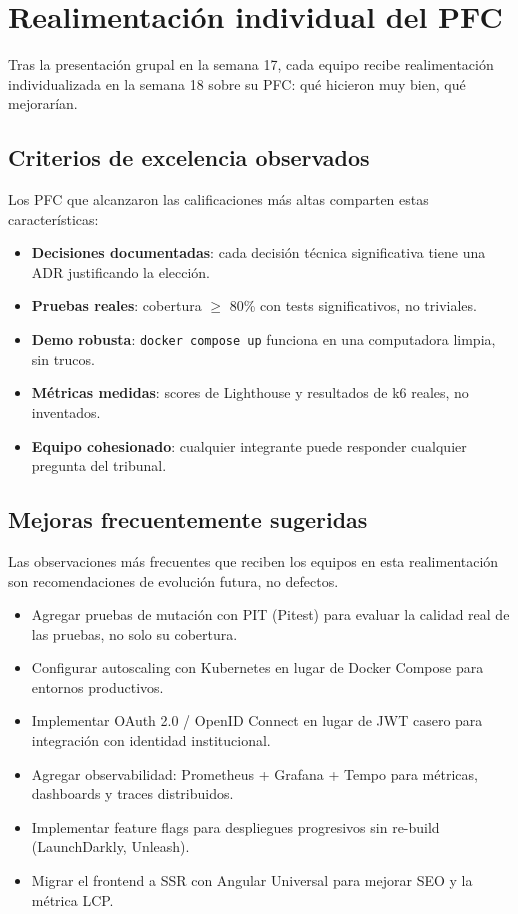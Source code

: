 \documentclass[11pt,a4paper,openany]{book}
\begin{document}
\section{Realimentación individual del PFC}

Tras la presentación grupal en la semana 17, cada equipo
recibe realimentación individualizada en la semana 18 sobre su
PFC: qué hicieron muy bien, qué mejorarían.


\subsection{Criterios de excelencia observados}

Los PFC que alcanzaron las calificaciones más altas comparten estas
características:

\begin{itemize}
\item \textbf{Decisiones documentadas}: cada decisión técnica
significativa tiene una ADR justificando la elección.
\item \textbf{Pruebas reales}: cobertura $\geq$ 80\% con tests
significativos, no triviales.
\item \textbf{Demo robusta}: \texttt{docker compose up} funciona en
una computadora limpia, sin trucos.
\item \textbf{Métricas medidas}: scores de Lighthouse y resultados de
k6 reales, no inventados.
\item \textbf{Equipo cohesionado}: cualquier integrante puede
responder cualquier pregunta del tribunal.
\end{itemize}

\subsection{Mejoras frecuentemente sugeridas}

Las observaciones más frecuentes que reciben los equipos
en esta realimentación son recomendaciones de evolución futura,
no defectos.


\begin{itemize}
\item Agregar pruebas de mutación con PIT (Pitest) para evaluar la
calidad real de las pruebas, no solo su cobertura.
\item Configurar autoscaling con Kubernetes en lugar de Docker
Compose para entornos productivos.
\item Implementar OAuth 2.0 / OpenID Connect en lugar de JWT casero
para integración con identidad institucional.
\item Agregar observabilidad: Prometheus + Grafana + Tempo para
métricas, dashboards y traces distribuidos.
\item Implementar feature flags para despliegues progresivos sin
re-build (LaunchDarkly, Unleash).
\item Migrar el frontend a SSR con Angular Universal para mejorar
SEO y la métrica LCP.
\end{itemize}
\end{document}
